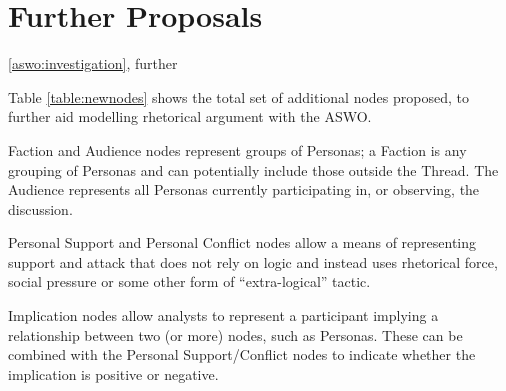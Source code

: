 
\newcommand{\imageScale}{0.55}
\newcommand{\nodeScale}{0.95}

\newcommand{\simon}{A }
\newcommand{\jodi}{B }
\newcommand{\bob}{C }
\newcommand{\lizzy}{D }
\newcommand{\ash}{E }
\newcommand{\chris}{F }


\section{Further Proposals}

 \ref{aswo:investigation}, further

Table \ref{table:newnodes} shows the total set of additional nodes proposed, to further aid modelling rhetorical argument with the ASWO.

Faction and Audience nodes represent groups of Personas; a Faction is any grouping of Personas and can potentially include those outside the Thread. The Audience represents all Personas currently participating in, or observing, the discussion.

Personal Support and Personal Conflict nodes allow a means of representing support and attack that does not rely on logic and instead uses rhetorical force, social pressure or some other form of ``extra-logical'' tactic.

Implication nodes allow analysts to represent a participant implying a relationship between two (or more) nodes, such as Personas. These can be combined with the Personal Support/Conflict nodes to indicate whether the implication is positive or negative.


